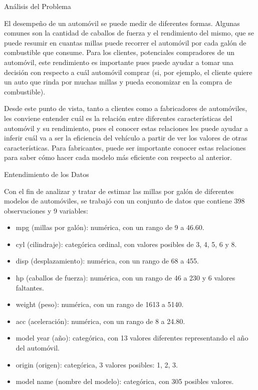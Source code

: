 \documentclass[]{article}
\providecommand{\tightlist}{%
  \setlength{\itemsep}{0pt}\setlength{\parskip}{0pt}}
\begin{document}
Análisis del Problema

El desempeño de un automóvil se puede medir de diferentes formas.
Algunas comunes son la cantidad de caballos de fuerza y el rendimiento
del mismo, que se puede resumir en cuantas millas puede recorrer el
automóvil por cada galón de combustible que consume. Para los clientes,
potenciales compradores de un automóvil, este rendimiento es importante
pues puede ayudar a tomar una decisión con respecto a cuál automóvil
comprar (si, por ejemplo, el cliente quiere un auto que rinda por muchas
millas y pueda economizar en la compra de combustible).

Desde este punto de vista, tanto a clientes como a fabricadores de
automóviles, les conviene entender cuál es la relación entre diferentes
características del automóvil y su rendimiento, pues el conocer estas
relaciones les puede ayudar a inferir cuál va a ser la eficiencia del
vehículo a partir de ver los valores de otras características. Para
fabricantes, puede ser importante conocer estas relaciones para saber
cómo hacer cada modelo más eficiente con respecto al anterior.

Entendimiento de los Datos

Con el fin de analizar y tratar de estimar las millas por galón de
diferentes modelos de automóviles, se trabajó con un conjunto de datos
que contiene 398 observaciones y 9 variables:

\begin{itemize}
\tightlist
\item
  mpg (millas por galón): numérica, con un rango de 9 a 46.60.
\item
  cyl (cilindraje): categórica ordinal, con valores posibles de 3, 4, 5,
  6 y 8.
\item
  disp (desplazamiento): numérica, con un rango de 68 a 455.
\item
  hp (caballos de fuerza): numérica, con un rango de 46 a 230 y 6
  valores faltantes.
\item
  weight (peso): numérica, con un rango de 1613 a 5140.
\item
  acc (aceleración): numérica, con un rango de 8 a 24.80.
\item
  model year (año): categórica, con 13 valores diferentes representando
  el año del automóvil.
\item
  origin (origen): categórica, 3 valores posibles: 1, 2, 3.
\item
  model name (nombre del modelo): categórica, con 305 posibles valores.
\end{itemize}
\end{document}

